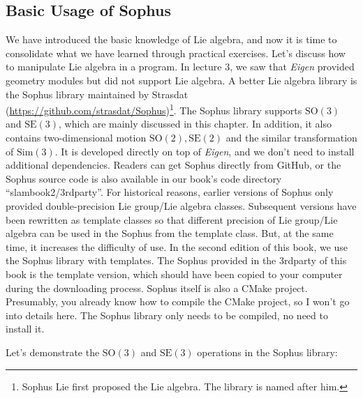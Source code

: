 \subsection{Basic Usage of Sophus}
We have introduced the basic knowledge of Lie algebra, and now it is time to consolidate what we have learned through practical exercises. Let's discuss how to manipulate Lie algebra in a program. In lecture 3, we saw that \textit{Eigen} provided geometry modules but did not support Lie algebra. A better Lie algebra library is the Sophus library maintained by Strasdat (\url{https://github.com/strasdat/Sophus})\footnote{Sophus Lie first proposed the Lie algebra. The library is named after him.}. The Sophus library supports $\mathrm{SO}(3)$ and $\mathrm{SE}(3)$, which are mainly discussed in this chapter. In addition, it also contains two-dimensional motion $\mathrm{SO}(2), \mathrm{SE} (2) $ and the similar transformation of $\mathrm{Sim}(3)$. It is developed directly on top of \textit{Eigen}, and we don't need to install additional dependencies. Readers can get Sophus directly from GitHub, or the Sophus source code is also available in our book's code directory ``slambook2/3rdparty''. For historical reasons, earlier versions of Sophus only provided double-precision Lie group/Lie algebra classes. Subsequent versions have been rewritten as template classes so that different precision of Lie group/Lie algebra can be used in the Sophus from the template class. But, at the same time, it increases the difficulty of use. In the second edition of this book, we use the Sophus library with templates. The Sophus provided in the 3rdparty of this book is the template version, which should have been copied to your computer during the downloading process. Sophus itself is also a CMake project. Presumably, you already know how to compile the CMake project, so I won't go into details here. The Sophus library only needs to be compiled, no need to install it.

Let's demonstrate the $\mathrm{SO}(3)$ and $\mathrm{SE}(3)$ operations in the Sophus library:

